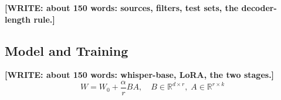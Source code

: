 \documentclass[conference]{IEEEtran}
\newcommand{\WRITE}[1]{{\color{red}\textbf{[WRITE: #1]}}}
\begin{document}
\WRITE{about 150 words: sources, filters, test sets, the decoder-length rule.}

\subsection{Model and Training}

\WRITE{about 150 words: whisper-base, LoRA, the two stages.}
\begin{equation}
W = W_0 + \frac{\alpha}{r} B A, \quad B \in \mathbb{R}^{d \times r},\; A \in \mathbb{R}^{r \times k}
\label{eq:lora}
\end{equation}
\end{document}
